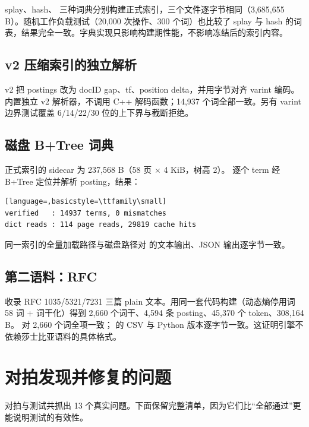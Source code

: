 splay、hash、 三种词典分别构建正式索引，三个文件逐字节相同（3,685,655 B）。随机工作负载测试（20,000 次操作、300 个词）也比较了 splay 与 hash 的词表，结果完全一致。字典实现只影响构建期性能，不影响冻结后的索引内容。

\subsection{v2 压缩索引的独立解析}

v2 把 postings 改为 docID gap、tf、position delta，并用字节对齐 varint 编码。 内置独立 v2 解析器，不调用 C++ 解码函数；14,937 个词全部一致。另有 varint 边界测试覆盖 6/14/22/30 位的上下界与截断拒绝。

\subsection{磁盘 B+Tree 词典}

正式索引的 sidecar 为 237,568 B（58 页 $\times$ 4 KiB，树高 2）。 逐个 term 经 B+Tree 定位并解析 posting，结果：

\begin{lstlisting}[language=,basicstyle=\ttfamily\small]
verified   : 14937 terms, 0 mismatches
dict reads : 114 page reads, 29819 cache hits
\end{lstlisting}

同一索引的全量加载路径与磁盘路径对  的文本输出、JSON 输出逐字节一致。

\subsection{第二语料：RFC}

 收录 RFC 1035/5321/7231 三篇 plain 文本。用同一套代码构建（动态熵停用词 58 词 + 词干化）得到 2,660 个词干、4,594 条 posting、45,370 个 token、308,164 B。 对 2,660 个词全项一致； 的 CSV 与 Python 版本逐字节一致。这证明引擎不依赖莎士比亚语料的具体格式。

\section{对拍发现并修复的问题}

对拍与测试共抓出 13 个真实问题。下面保留完整清单，因为它们比“全部通过”更能说明测试的有效性。

